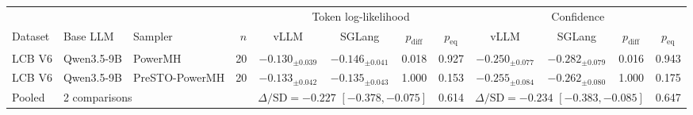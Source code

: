 \begin{tabular}{lllr cccc cccc}
\toprule
 & & & & \multicolumn{4}{c}{Token log-likelihood} & \multicolumn{4}{c}{Confidence} \\
\cmidrule(lr){5-8}\cmidrule(lr){9-12}
Dataset & Base LLM & Sampler & $n$ & vLLM & SGLang & $p_{\mathrm{diff}}$ & $p_{\mathrm{eq}}$ & vLLM & SGLang & $p_{\mathrm{diff}}$ & $p_{\mathrm{eq}}$ \\
\midrule
LCB V6 & Qwen3.5-9B & PowerMH & 20 & $-0.130_{\pm 0.039}$ & $-0.146_{\pm 0.041}$ & 0.018 & 0.927 & $-0.250_{\pm 0.077}$ & $-0.282_{\pm 0.079}$ & 0.016 & 0.943 \\
LCB V6 & Qwen3.5-9B & PreSTO-PowerMH & 20 & $-0.133_{\pm 0.042}$ & $-0.135_{\pm 0.043}$ & 1.000 & 0.153 & $-0.255_{\pm 0.084}$ & $-0.262_{\pm 0.080}$ & 1.000 & 0.175 \\
\midrule
Pooled & \multicolumn{3}{l}{2 comparisons} & \multicolumn{3}{c}{$\Delta/\mathrm{SD}=-0.227$ $[-0.378, -0.075]$} & 0.614 & \multicolumn{3}{c}{$\Delta/\mathrm{SD}=-0.234$ $[-0.383, -0.085]$} & 0.647 \\
\bottomrule
\end{tabular}
